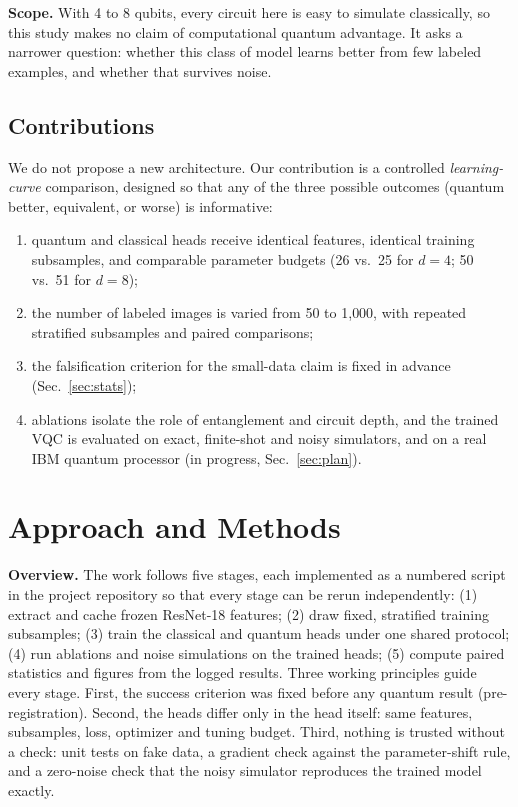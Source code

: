 \documentclass[conference]{IEEEtran}
\begin{document}
\textbf{Scope.} With 4 to 8 qubits, every circuit here is easy to simulate
classically, so this study makes no claim of computational quantum
advantage. It asks a narrower question: whether this class of model
learns better from few labeled examples, and whether that survives noise.

\subsection{Contributions}

We do not propose a new architecture. Our
contribution is a controlled \emph{learning-curve} comparison, designed so
that any of the three possible outcomes (quantum better, equivalent, or
worse) is informative:
\begin{enumerate}
\item quantum and classical heads receive identical features, identical
training subsamples, and comparable parameter budgets (26 vs.\ 25 for
$d=4$; 50 vs.\ 51 for $d=8$);
\item the number of labeled images is varied from 50 to 1{,}000, with
repeated stratified subsamples and paired comparisons;
\item the falsification criterion for the small-data claim is fixed in
advance (Sec.~\ref{sec:stats});
\item ablations isolate the role of entanglement and circuit depth, and the
trained VQC is evaluated on exact, finite-shot and noisy simulators, and
on a real IBM quantum processor (in progress, Sec.~\ref{sec:plan}).
\end{enumerate}

\section{Approach and Methods}
\label{sec:approach}
\textbf{Overview.} The work follows five stages, each implemented as a
numbered script in the project repository so that every stage can be
rerun independently: (1) extract and cache frozen ResNet-18 features;
(2) draw fixed, stratified training subsamples; (3) train the classical and
quantum heads under one shared protocol; (4) run ablations and noise
simulations on the trained heads; (5) compute paired statistics and
figures from the logged results. Three working principles guide every
stage. First, the success criterion was fixed before any quantum result
(pre-registration). Second, the heads differ only in the head itself:
same features, subsamples, loss, optimizer and tuning budget. Third,
nothing is trusted without a check: unit tests on fake data, a gradient
check against the parameter-shift rule, and a zero-noise check that the
noisy simulator reproduces the trained model exactly.
\end{document}
